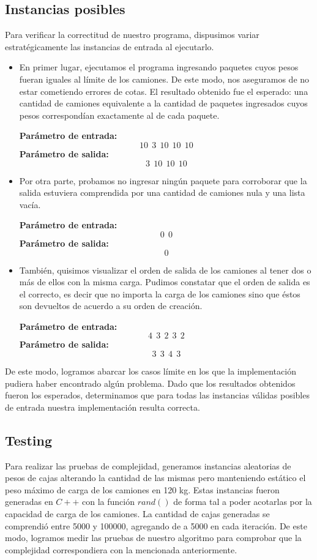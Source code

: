 \subsection{Instancias posibles}
Para verificar la correctitud de nuestro programa, dispusimos variar estratégicamente las instancias de entrada al ejecutarlo.
\begin{itemize}
\item En primer lugar, ejecutamos el programa ingresando paquetes cuyos pesos fueran iguales al límite de los camiones. De este modo, nos aseguramos de no estar cometiendo errores de cotas. El resultado obtenido fue el esperado: una cantidad de camiones equivalente a la cantidad de paquetes ingresados cuyos pesos correspondían exactamente al de cada paquete.\newline

\textbf{Parámetro de entrada:} $$10\ \ 3\ \ 10\ \ 10\ \ 10$$
\textbf{Parámetro de salida:} $$3\ \ 10\ \ 10\ \ 10$$
\item Por otra parte, probamos no ingresar ningún paquete para corroborar que la salida estuviera comprendida por una cantidad de camiones nula y una lista vacía.\newline

\textbf{Parámetro de entrada:} $$0\ \ 0$$
\textbf{Parámetro de salida:} $$0$$
\item También, quisimos visualizar el orden de salida de los camiones al tener dos o más de ellos con la misma carga. Pudimos constatar que el orden de salida es el correcto, es decir que no importa la carga de los camiones sino que éstos son devueltos de acuerdo a su orden de creación.\newline

\textbf{Parámetro de entrada:} $$4\ \ 3\ \ 2\ \ 3\ \ 2$$
\textbf{Parámetro de salida:} $$3\ \ 3\ \ 4\ \ 3$$
\end{itemize}

De este modo, logramos abarcar los casos límite en los que la implementación pudiera haber encontrado algún problema. Dado que los resultados obtenidos fueron los esperados, determinamos que para todas las instancias válidas posibles de entrada nuestra implementación resulta correcta.

\subsection{Testing}

Para realizar las pruebas de complejidad, generamos instancias aleatorias de pesos de cajas alterando la cantidad de las mismas pero manteniendo estático el peso máximo de carga de los camiones en 120 \unit{kg}. Estas instancias fueron generadas en $C++$ con la función $rand()$ de forma tal a poder acotarlas por la capacidad de carga de los camiones. La cantidad de cajas generadas se comprendió entre 5000 y 100000, agregando de a 5000 en cada iteración. De este modo, logramos medir las pruebas de nuestro algoritmo para comprobar que la complejidad correspondiera con la mencionada anteriormente.

